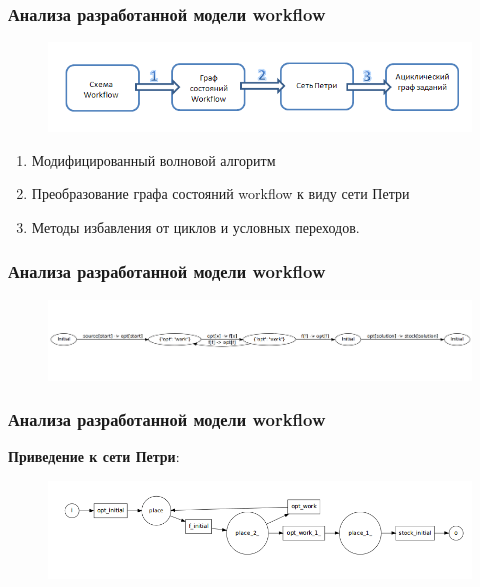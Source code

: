\documentclass[10pt,pdf,hyperref={unicode}]{beamer}
\begin{document}
\begin{frame}
\frametitle{Анализа разработанной модели workflow}

\begin{figure}[here]
    \centering
    \includegraphics[width=\textwidth]{analys_plan.png}
    \label{img:opt_wf}
\end{figure}

\begin{enumerate}
\item Модифицированный волновой алгоритм
\item Преобразование графа состояний workflow к виду сети Петри
\item Методы избавления от циклов и условных переходов.
\end{enumerate}
\end{frame}

\begin{frame}
\frametitle{Анализа разработанной модели workflow}
\begin{figure}[here]
    \centering
    \includegraphics[width=\textwidth]{optimization_state_graph.png} 
    \label{img:opt_wf}
\end{figure}
\end{frame}

\begin{frame}
\frametitle{Анализа разработанной модели workflow}
\textbf{Приведение к сети Петри}:
\begin{figure}[here]
    \centering
    \includegraphics[width=\textwidth]{optimization_petri_net.png} 
    \label{img:opt_wf}
\end{figure}
\end{frame}
\end{document}

